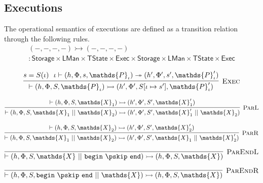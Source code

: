 \subsection{Executions}

The operational semantics of executions are defined as a transition relation through the following rules.
\begin{gather*}
(-, -, -, -) \rightarrowtail (-, -, -, -) \\
: \mathsf{Storage} \times \mathsf{LMan} \times \mathsf{TState} \times \mathsf{Exec} \times \mathsf{Storage} \times \mathsf{LMan} \times \mathsf{TState} \times \mathsf{Exec}
\end{gather*}

\[
\infer[\textsc{Exec}]
{
	\vdash (h, \Phi, S, \mathds{P}_\iota)
	\rightarrowtail
	(h', \Phi', S[\iota \mapsto s'], \mathds{P}_\iota')
}
{
	s = S(\iota)\ \
	\iota \vdash (h, \Phi, s, \mathds{P}_\iota)
	\twoheadrightarrow
	(h', \Phi', s', \mathds{P}_\iota')
}
\]

\[
\infer[\textsc{ParL}]
{
	\vdash (h, \Phi, S, \mathds{X}_1\ ||\ \mathds{X}_2)
	\rightarrowtail
	(h', \Phi', S', \mathds{X}_1'\ ||\ \mathds{X}_2)
}
{
	\vdash (h, \Phi, S, \mathds{X}_1)
	\rightarrowtail
	(h', \Phi', S', \mathds{X}_1')
}
\]

\[
\infer[\textsc{ParR}]
{
	\vdash (h, \Phi, S, \mathds{X}_1\ ||\ \mathds{X}_2)
	\rightarrowtail
	(h', \Phi', S', \mathds{X}_1\ ||\ \mathds{X}_2')
}
{
	\vdash (h, \Phi, S, \mathds{X}_2)
	\rightarrowtail
	(h', \Phi', S', \mathds{X}_2')
}
\]

\[
\infer[\textsc{ParEndL}]
{
	\vdash (h, \Phi, S, \mathds{X}\ ||\ \mathtt{begin}\ \pskip\ \mathtt{end})
	\rightarrowtail
	(h, \Phi, S, \mathds{X})
}
{}
\]

\[
\infer[\textsc{ParEndR}]
{
	\vdash (h, \Phi, S, \mathtt{begin}\ \pskip\ \mathtt{end}\ ||\ \mathds{X})
	\rightarrowtail
	(h, \Phi, S, \mathds{X})
}
{}
\]